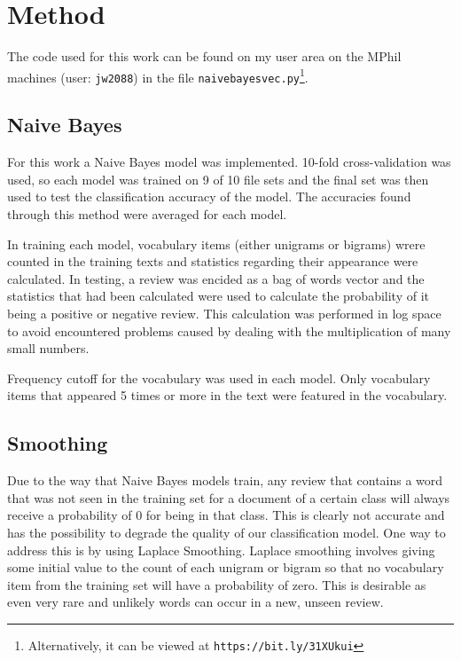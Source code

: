 \documentclass[twocolumn]{article}
\begin{document}
\section{Method}


The code used for this work can be found on my user area on the MPhil machines (user: \texttt{jw2088}) in the file \texttt{naivebayesvec.py}\footnote{Alternatively, it can be viewed at \texttt{https://bit.ly/31XUkui}}.

\subsection{Naive Bayes}

For this work a Naive Bayes model was implemented. 10-fold cross-validation was used, so each model was trained on 9 of 10 file sets and the final set was then used to test the classification accuracy of the model. The accuracies found through this method were averaged for each model. 

In training each model, vocabulary items (either unigrams or bigrams) wrere counted in the training texts and statistics regarding their appearance were calculated. In testing, a review was encided as a bag of words vector and the statistics that had been calculated were used to calculate the probability of it being a positive or negative review. This calculation was performed in log space to avoid encountered problems caused by dealing with the multiplication of many small numbers.

Frequency cutoff for the vocabulary was used in each model. Only vocabulary items that appeared 5 times or more in the text were featured in the vocabulary.

\subsection{Smoothing}

Due to the way that Naive Bayes models train, any review that contains a word that was not seen in the training set for a document of a certain class will always receive a probability of 0 for being in that class. This is clearly not accurate and has the possibility to degrade the quality of our classification model. One way to address this is by using Laplace Smoothing. Laplace smoothing involves giving some initial value to the count of each unigram or bigram so that no vocabulary item from the training set will have a probability of zero. This is desirable as even very rare and unlikely words can occur in a new, unseen review.
\end{document}

